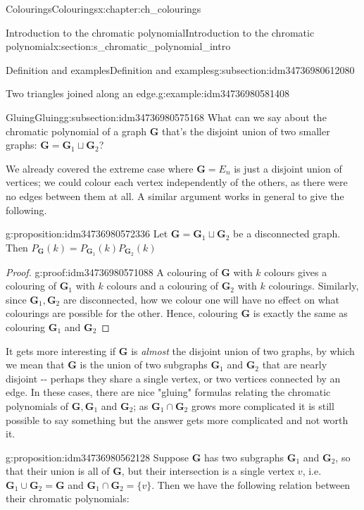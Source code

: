 \documentclass[oneside,10pt,]{book}
\numberwithin{equation}{section}
\newcommand{\bfG}{\mathbf{G}}
\begin{document}
\begin{chapterptx}{Colourings}{}{Colourings}{}{}{x:chapter:ch_colourings}
\begin{sectionptx}{Introduction to the chromatic polynomial}{}{Introduction to the chromatic polynomial}{}{}{x:section:s_chromatic_polynomial_intro}
\begin{subsectionptx}{Definition and examples}{}{Definition and examples}{}{}{g:subsection:idm34736980612080}
\begin{example}{Two triangles joined along an edge.}{g:example:idm34736980581408}
\begin{sidebyside}{2}{0.025}{0.025}{0.05}
\begin{sbspanel}{0.3}
{\begin{tikzpicture}[scale=2]
\end{tikzpicture}
}%
\end{sbspanel}%
\end{sidebyside}%
\end{example}
\end{subsectionptx}
%
%
\typeout{************************************************}
\typeout{************************************************}
%
\begin{subsectionptx}{Gluing}{}{Gluing}{}{}{g:subsection:idm34736980575168}
What can we say about the chromatic polynomial of a graph \(\bfG\) that's the disjoint union of two smaller graphs: \(\bfG=\bfG_1\sqcup \bfG_2\)?%
\par
We already covered the extreme case where \(\bfG=E_n\) is just a disjoint union of vertices; we could colour each vertex independently of the others, as there were no edges between them at all. A similar argument works in general to give the following.%
\begin{proposition}{}{}{g:proposition:idm34736980572336}%
Let \(\bfG=\bfG_1\sqcup \bfG_2\) be a disconnected graph.  Then \(P_{\bfG}(k)=P_{\bfG_1}(k)P_{\bfG_2}(k)\)%
\end{proposition}
\begin{proof}{}{g:proof:idm34736980571088}
A colouring of \(\bfG\) with \(k\) colours gives a colouring of \(\bfG_1\) with \(k\) colours and a colouring of \(\bfG_2\) with \(k\) colourings. Similarly, since \(\bfG_1, \bfG_2\) are disconnected, how we colour one will have no effect on what colourings are possible for the other.  Hence, colouring \(\bfG\) is exactly the same as colouring \(\bfG_1\) and \(\bfG_2\)%
\end{proof}
 It gets more interesting if \(\bfG\) is \emph{almost} the disjoint union of two graphs, by which we mean that \(\bfG\) is the union of two subgraphs \(\bfG_1\) and \(\bfG_2\) that are nearly disjoint -{}-{} perhaps they share a single vertex, or two vertices connected by an edge.  In these cases, there are nice "gluing" formulas relating the chromatic polynomials of \(\bfG, \bfG_1\) and \(\bfG_2\); as \(\bfG_1\cap\bfG_2\) grows more complicated it is still possible to say something but the answer gets more complicated and not worth it. \begin{proposition}{}{}{g:proposition:idm34736980562128}%
Suppose \(\bfG\) has two subgraphs \(\bfG_1\) and \(\bfG_2\), so that their union is all of \(\bfG\), but their intersection is a single vertex \(v\), i.e. \(\bfG_1\cup\bfG_2=\bfG\) and \(\bfG_1\cap\bfG_2=\{v\}\).  Then we have the following relation between their chromatic polynomials:%

\end{proposition}
\end{subsectionptx}
\end{sectionptx}
\end{chapterptx}
\end{document}
